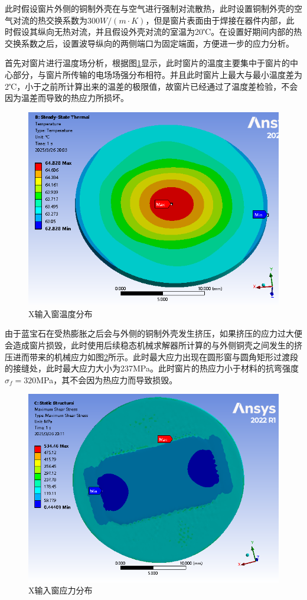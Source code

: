 \documentclass[master]{thesis-uestc}
\begin{document}
此时假设窗片外侧的铜制外壳在与空气进行强制对流散热，此时设置铜制外壳的空气对流的热交换系数为\(300 W/ (m \cdot K)\)，但是窗片表面由于焊接在器件内部，此时假设其纵向无热对流，并且假设外壳对流的室温为20℃。在设置好期间内部的热交换系数之后，设置波导纵向的两侧端口为固定端面，方便进一步的应力分析。

首先对窗片进行温度场分析，根据图\ref{fig:X输入温度场}显示，此时窗片的温度主要集中于窗片的中心部分，与窗片所传输的电场场强分布相符。并且此时窗片上最大与最小温度差为2℃，小于之前所计算出来的温差的极限值，故窗片已经通过了温度差检验，不会因为温差而导致的热应力所损坏。
\begin{figure}[!htb]
    \centering
    \includegraphics[width=0.5\linewidth]{pic/chapter3/X频段温度分布.png}
    \caption{X输入窗温度分布}
    \label{fig:X输入温度场}
\end{figure}

由于蓝宝石在受热膨胀之后会与外侧的铜制外壳发生挤压，如果挤压的应力过大便会造成窗片损毁，此时使用后续稳态机械求解器所计算的与外侧铜壳之间发生的挤压进而带来的机械应力如图\ref{fig:X输入应力分布}所示。此时最大应力出现在圆形窗与圆角矩形过渡段的接缝处，此时最大应力大小为237MPa。此时窗片的热应力小于材料的抗弯强度\(\sigma_f = 320\)MPa，其不会因为热应力而导致损毁。
\begin{figure}[!htb]
    \centering
    \includegraphics[width=0.5\linewidth]{pic/chapter3/X频段应力分布.png}
    \caption{X输入窗应力分布}
    \label{fig:X输入应力分布}
\end{figure}
\end{document}
